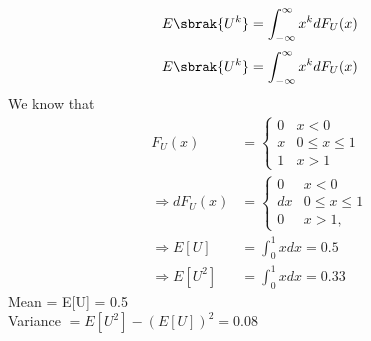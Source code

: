 \documentclass[journal,12pt,twocolumn]{IEEEtran}
\renewcommand\thesection{\arabic{section}}
\begin{document}
\begin{enumerate}[label=\thesection.\arabic*
,ref=\thesection.\theenumi]
%
\begin{equation}
E\sbrak{U^k} = \int_{-\infty}^{\infty}x^kdF_{U}(x)
\end{equation}
\begin{equation}
E\sbrak{U^k} = \int_{-\infty}^{\infty}x^kdF_{U}(x)
\end{equation}
\solution We know that
\begin{align}
    F_U(x) &= 
    \begin{cases}
    0 & x < 0 \\
    x &  0 \le x \le 1 \\
    1 & x > 1 
    \end{cases} \\
    \Rightarrow dF_U(x) &= 
    \begin{cases}
    0 & x < 0 \\
    dx &  0 \le x \le 1 \\
    0 & x > 1 ,
    \end{cases} \\ 
    \Rightarrow E[U] &= \int_{0}^{1} xdx  = 0.5 \\
    \Rightarrow E[U^2] &= \int_{0}^{1} xdx  = 0.33 
\end{align}
Mean = E[U] = 0.5 \\
Variance $= E[U^2] -(E[U])^2 = 0.08 $
\end{enumerate}
\end{document}

